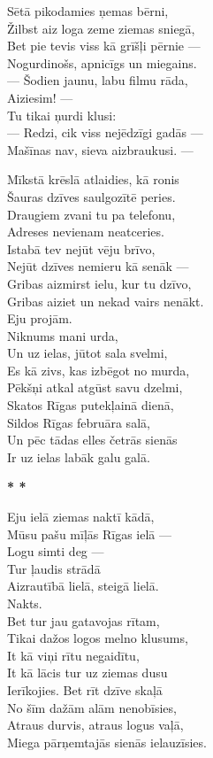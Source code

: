 \documentclass[11pt]{article}
\begin{document}
{Sētā pikodamies ņemas bērni,\\
Žilbst aiz loga zeme ziemas sniegā,\\
Bet pie tevis viss kā grīšļi pērnie ---\\
Nogurdinošs, apnicīgs un miegains.\\
--- Šodien jaunu, labu filmu rāda,\\
Aiziesim! ---\\
Tu tikai ņurdi klusi:\\
--- Redzi, cik viss nejēdzīgi gadās ---\\
Mašīnas nav, sieva aizbraukusi. ---

Mīkstā krēslā atlaidies, kā ronis\\
Šauras dzīves saulgozītē peries.\\
Draugiem zvani tu pa telefonu,\\
Adreses nevienam neatceries.\\
Istabā tev nejūt vēju brīvo,\\
Nejūt dzīves nemieru kā senāk ---\\
Gribas aizmirst ielu, kur tu dzīvo,\\
Gribas aiziet un nekad vairs nenākt.\\
Eju projām.\\
Niknums mani urda,\\
Un uz ielas, jūtot sala svelmi,\\
Es kā zivs, kas izbēgot no murda,\\
Pēkšņi atkal atgūst savu dzelmi,\\
Skatos Rīgas putekļainā dienā,\\
Sildos Rīgas februāra salā,\\
Un pēc tādas elles četrās sienās\\
Ir uz ielas labāk galu galā.

\newpage
{\bf * * *}

Eju ielā ziemas naktī kādā,\\
Mūsu pašu mīļās Rīgas ielā ---\\
Logu simti deg ---\\
Tur ļaudis strādā\\
Aizrautībā lielā, steigā lielā.\\
Nakts.\\
Bet tur jau gatavojas rītam,\\
Tikai dažos logos melno klusums,\\
It kā viņi rītu negaidītu,\\
It kā lācis tur uz ziemas dusu\\
Ierīkojies. Bet rīt dzīve skaļā\\
No šīm dažām alām nenobīsies,\\
Atraus durvis, atraus logus vaļā,\\
Miega pārņemtajās sienās ielauzīsies.

}
\end{document}
